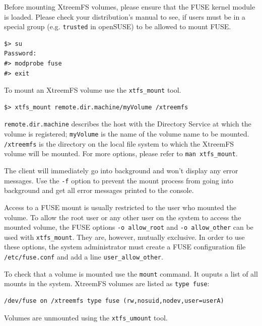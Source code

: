 \documentclass[a4paper,10pt]{book}
\begin{document}
Before mounting XtreemFS volumes, please ensure that the FUSE kernel module is loaded. Please check your distribution's manual to see, if users must be in a special group (e.g. \texttt{trusted} in openSUSE) to be allowed to mount FUSE.


\begin{verbatim}
$> su
Password:
#> modprobe fuse
#> exit
\end{verbatim}


To mount an XtreemFS volume use the \texttt{xtfs\_mount} tool.


\begin{verbatim}
$> xtfs_mount remote.dir.machine/myVolume /xtreemfs
\end{verbatim}


\texttt{remote.dir.machine} describes the host with the Directory Service at which the volume is registered; \texttt{myVolume} is the name of the volume name to be mounted. \texttt{/xtreemfs} is the directory on the local file system to which the XtreemFS volume will be mounted. For more options, please refer to \texttt{man xtfs\_mount}.

The client will immediately go into background and won't display any error messages. Use the \texttt{-f} option to prevent the mount process from going into background and get all error messages printed to the console.

Access to a FUSE mount is usually restricted to the user who mounted the volume. To allow the root user or any other user on the system to access the mounted volume, the FUSE options \texttt{-o allow\_root} and \texttt{-o allow\_other} can be used with \texttt{xtfs\_mount}. They are, however, mutually exclusive. In order to use these options, the system administrator must create a FUSE configuration file \texttt{/etc/fuse.conf} and add a line \texttt{user\_allow\_other}.

To check that a volume is mounted use the \texttt{mount} command. It ouputs a list of all mounts in the system. XtreemFS volumes are listed as \texttt{type fuse}:

\begin{verbatim}
/dev/fuse on /xtreemfs type fuse (rw,nosuid,nodev,user=userA)
\end{verbatim}

Volumes are unmounted using the \texttt{xtfs\_umount} tool.
\end{document}
